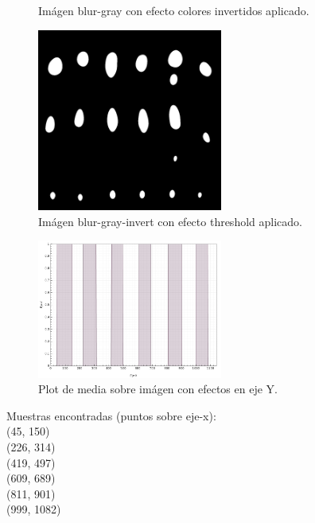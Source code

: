 \begin{itemize}
\begin{figure}[H]
	  \centering
	  \vspace{-0.4cm}
	  \caption{Im\'agen blur-gray con efecto colores invertidos aplicado.}
	  \label{fig:font-c-invert}
	  \vspace{-0.15cm}
	\end{figure}
	\begin{figure}[H]
	  \vspace{-0.2cm}
	  \centering
	  \includegraphics[width=230px]{imagenes-jtlc/experimento/search-samples/4-threshold}
	  \centering
	  \vspace{-0.4cm}
	  \caption{Im\'agen blur-gray-invert con efecto threshold aplicado.}
	  \label{fig:font-c-thresh}
	  \vspace{-0.15cm}
	\end{figure}
	\begin{figure}[H]
	  \vspace{-0.2cm}
	  \centering
	  \includegraphics[width=230px]{imagenes-jtlc/experimento/search-samples/plot-y}
	  \centering
	  \vspace{-0.4cm}
	  \caption{Plot de media sobre im\'agen con efectos en eje Y.}
	  \label{fig:font-c-plot-y}
	  \vspace{-0.15cm}
	\end{figure}
	Muestras encontradas (puntos sobre eje-x):\\
	(45, 150)\\
	(226, 314)\\
	(419, 497)\\
	(609, 689)\\
	(811, 901)\\
	(999, 1082)\\
	

\end{itemize}
